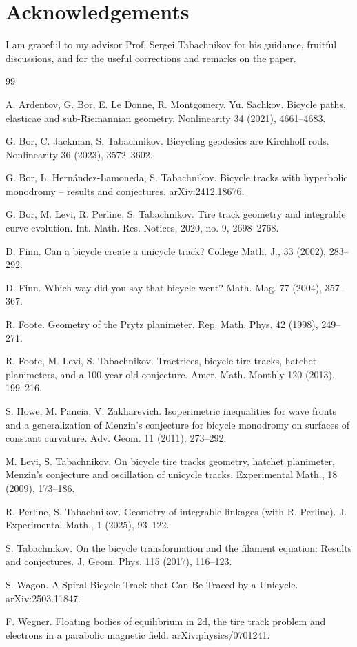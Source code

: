 \documentclass{article}
\theoremstyle{definition}
\begin{document}
\vskip 2cm

\section*{Acknowledgements}

I am grateful to my advisor Prof. Sergei Tabachnikov for his guidance, fruitful discussions, and for the useful corrections and remarks on the paper.

\vskip 2cm

\begin{thebibliography}{99}

 A. Ardentov, G. Bor, E. Le Donne, R. Montgomery, Yu. Sachkov. Bicycle paths, elasticae and sub-Riemannian geometry. Nonlinearity 34 (2021), 4661--4683.

 G. Bor, C. Jackman,  S. Tabachnikov. Bicycling geodesics are Kirchhoff rods. 
Nonlinearity 36 (2023), 3572--3602.

 G. Bor, L. Hern\'andez-Lamoneda, S. Tabachnikov. Bicycle tracks with hyperbolic monodromy -- results and conjectures.
arXiv:2412.18676.

  G. Bor, M. Levi, R. Perline, S. Tabachnikov. Tire track geometry and integrable curve evolution. Int. Math. Res. Notices, 2020, no. 9, 2698--2768.

 D. Finn. Can a bicycle create a unicycle track? College Math. J., 33 (2002), 283--292.

 D. Finn. Which way did you say that bicycle went? Math. Mag. 77 (2004), 357--367.

 R. Foote. Geometry of the Prytz planimeter. Rep. Math. Phys. 42 (1998), 249--271.

 R. Foote, M. Levi, S. Tabachnikov. Tractrices, bicycle tire tracks, hatchet planimeters, and a 100-year-old conjecture. Amer. Math. Monthly 120 (2013), 199--216.

 S. Howe, M. Pancia, V. Zakharevich. Isoperimetric inequalities for wave fronts and a generalization of Menzin’s conjecture for bicycle monodromy on surfaces of constant curvature. Adv. Geom. 11 (2011), 273--292.

 M. Levi, S. Tabachnikov. On bicycle tire tracks geometry, hatchet planimeter, Menzin’s conjecture and oscillation of unicycle tracks. Experimental Math., 18 (2009), 173--186.

 R. Perline, S. Tabachnikov. Geometry of integrable linkages (with R. Perline). J. Experimental Math., 1 (2025), 93--122.

 S. Tabachnikov. On the bicycle transformation and the filament equation: Results and conjectures. J. Geom. Phys. 115 (2017), 116--123.

 S. Wagon. A Spiral Bicycle Track that Can Be Traced by a Unicycle. arXiv:2503.11847.

 F. Wegner. Floating bodies of equilibrium in 2d, the tire track problem and electrons in a parabolic magnetic field. arXiv:physics/0701241.

\end{thebibliography}
\end{document}
